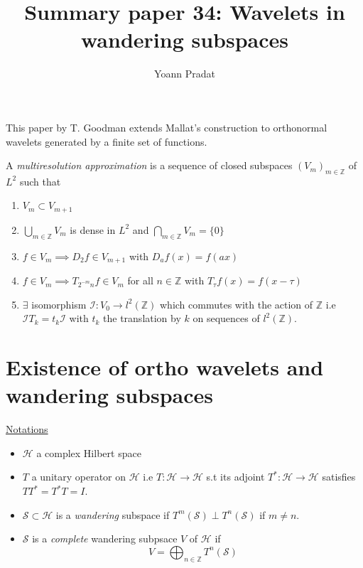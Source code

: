 \documentclass[a4paper, 11pt]{article}
\begin{document}
\title{Summary paper 34: Wavelets in wandering subspaces}
\author{Yoann Pradat}
\maketitle

This paper by T. Goodman extends Mallat's construction to orthonormal wavelets generated by a finite set of functions.  

\begin{deftn}{1}
  A \emph{multiresolution approximation} is a sequence of closed subspaces ${(V_m)}_{m \in \mathbb{Z}}$ of $L^2$ such 
  that
  \begin{enumerate}
    \item $V_m \subset V_{m+1}$
    \item $\bigcup_{m \in \mathbb{Z}} V_m$ is dense in $L^2$ and $\bigcap_{m \in \mathbb{Z}} V_m = \{0\}$
    \item $f \in V_m \implies D_2f \in V_{m+1}$ with $D_a f(x) = f(ax)$
    \item $f \in V_m \implies T_{2^{-m}n}f \in V_m$ for all $n \in \mathbb{Z}$ with $T_{\tau}f(x) = f(x-\tau)$
    \item $\exists$ isomorphism $\mathcal{I}: V_0\to{l^2(\mathbb{Z})}$ which commutes with the action of $\mathbb{Z}$
      i.e $\mathcal{I}T_k = t_k \mathcal{I}$ with $t_k$ the translation by $k$ on sequences of ${l^2(\mathbb{Z})}$.
  \end{enumerate}
\end{deftn}

\section{Existence of ortho wavelets and wandering subspaces}

\underline{Notations}
\begin{itemize}
  \item $\mathcal{H}$ a complex Hilbert space
  \item $T$ a unitary operator on $\mathcal{H}$ i.e $T: \mathcal{H} \to \mathcal{H}$ s.t its adjoint $T^* :\mathcal{H} 
    \to \mathcal{H}$ satisfies $TT^* = T^*T = I$.
  \item $\mathcal{S} \subset \mathcal{H}$ is a \emph{wandering} subspace if $T^m(\mathcal{S}) \perp T^n(\mathcal{S})$ if 
    $m \neq n$.
  \item $\mathcal{S}$ is a \emph{complete} wandering subpsace $V$ of $\mathcal{H}$ if
    \begin{equation*}
      V = \bigoplus_{n\in\mathbb{Z}} T^n(\mathcal{S})
    \end{equation*}
\end{itemize}
\end{document}
